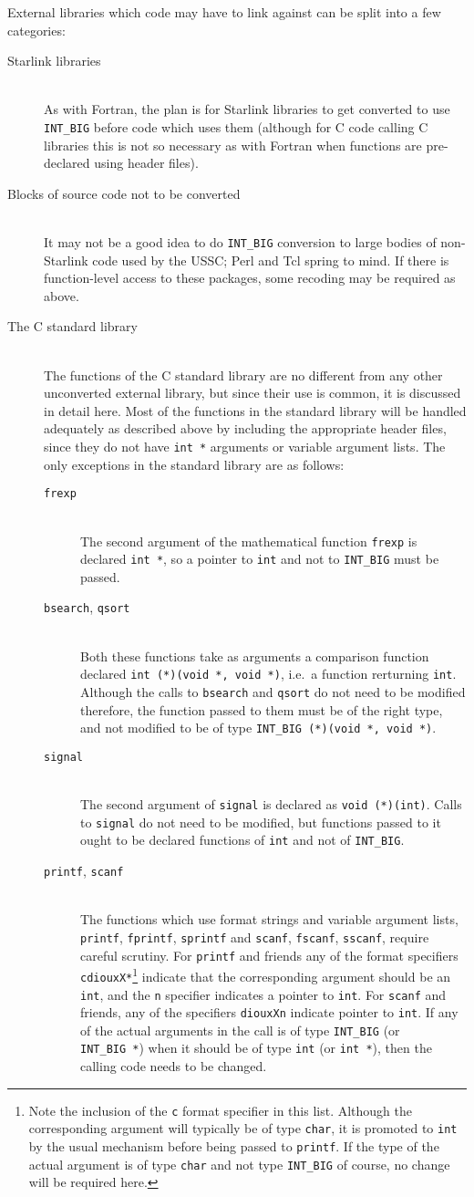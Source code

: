 \documentclass[twoside,11pt,nolof]{starlink}
\providecommand{\cc}[1]{\texttt{#1}}
\providecommand{\ditem}[1]{\item[#1]\mbox{}\\}
\begin{document}
External libraries which code may have to link against
can be split into a few categories:
\begin{description}
%
\ditem{Starlink libraries}
As with Fortran, the plan is for Starlink libraries to get converted
to use \cc{INT\_BIG}
before code which uses them (although for C code calling C libraries
this is not so necessary as with Fortran when functions are pre-declared
using header files).
%
\ditem{Blocks of source code not to be converted}
It may not be a good idea to do \cc{INT\_BIG} conversion to
large bodies of non-Starlink code used by the USSC; Perl and Tcl
spring to mind.
If there is function-level access to these packages,
some recoding may be required as above.
%
\ditem{The C standard library}
The functions of the C standard library are no different from any
other unconverted external library, but since their use is
common, it is discussed in detail here.
Most of the functions in the standard library will be handled
adequately as described above by including the appropriate header files,
since they do not have \cc{int~*} arguments or variable argument lists.
The only exceptions in the standard library are as follows:
\begin{description}
%
\ditem{\cc{frexp}}
The second argument of the mathematical function \cc{frexp} is declared
\cc{int *}, so a pointer to \cc{int} and not to \cc{INT\_BIG} must be passed.

%
\ditem{\cc{bsearch}, \cc{qsort}}
Both these functions take as arguments a comparison function
declared \cc{int (*)(void *, void *)},
i.e.\ a function rerturning \cc{int}.
Although the calls to \cc{bsearch} and \cc{qsort} do not need to be
modified therefore, the function passed to them must be of the right
type, and not modified to be of type \cc{INT\_BIG (*)(void *, void *)}.
%
\ditem{\cc{signal}}
The second argument of \cc{signal} is declared as \cc{void (*)(int)}.
Calls to \cc{signal} do not need to be modified, but functions
passed to it ought to be declared
functions of \cc{int} and not of \cc{INT\_BIG}.
%
\ditem{\cc{printf}, \cc{scanf}}
The functions which use format strings and variable argument lists,
\cc{printf}, \cc{fprintf}, \cc{sprintf} and
\cc{scanf}, \cc{fscanf}, \cc{sscanf},
require careful scrutiny.
For \cc{printf} and friends
any of the format specifiers \cc{cdiouxX*}\footnote{
   Note the inclusion of the \cc{c} format specifier in this list.
   Although the corresponding argument will typically be of type \cc{char},
   it is promoted to \cc{int} by the usual mechanism before being
   passed to \cc{printf}.  If the type of the actual argument is
   of type \cc{char} and not type \cc{INT\_BIG} of course, no change
   will be required here.
}
indicate that the corresponding argument should be an \cc{int},
and the \cc{n} specifier indicates a pointer to \cc{int}.
For \cc{scanf} and friends, any of the specifiers \cc{diouxXn} indicate
pointer to \cc{int}.
If any of the actual arguments in the call is of type \cc{INT\_BIG}
(or \cc{INT\_BIG~*}) when it should be of type \cc{int} (or \cc{int~*}),
then the calling code needs to be changed.


\end{description}
\end{description}
\end{document}

